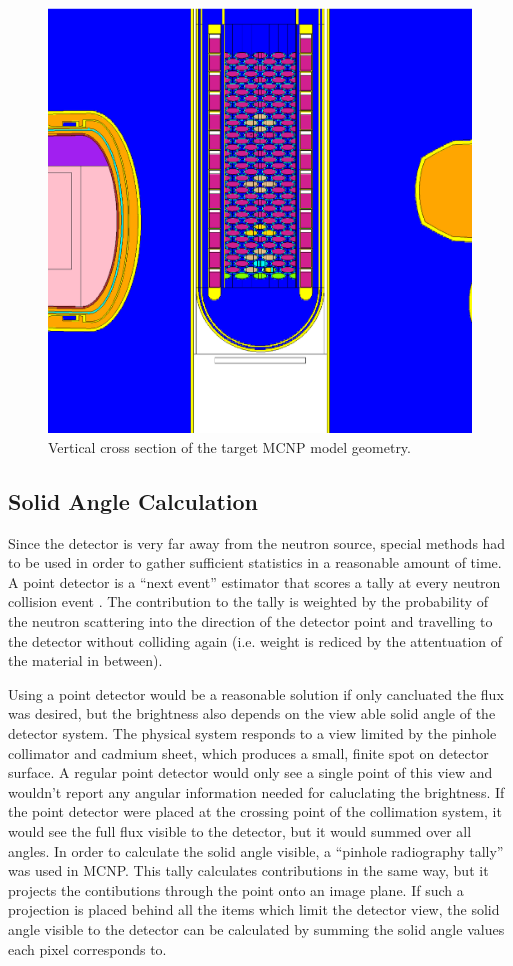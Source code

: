 \documentclass[preprint,12pt]{elsarticle}
\begin{document}
\begin{figure}[h!] 
  \centering
    \includegraphics[width=0.25\columnwidth,trim={5cm 0 5cm 0},clip]{graphics/target.eps}
     \caption{Vertical cross section of the target MCNP model geometry. \label{fig:target}}
\end{figure}

%
%
%
%
%

\subsection{Solid Angle Calculation}
\label{subsec:solidangle}

Since the detector is very far away from the neutron source, special methods had to be used in order to gather sufficient statistics in a reasonable amount of time.  A point detector is a ``next event'' estimator that scores a tally at every neutron collision event \cite{mcnp}.  The contribution to the tally is weighted by the probability of the neutron scattering into the direction of the detector point and travelling to the detector without colliding again (i.e. weight is rediced by the attentuation of the material in between).  

Using a point detector would be a reasonable solution if only cancluated the flux was desired, but the brightness also depends on the view able solid angle of the detector system.   The physical system responds to a view limited by the pinhole collimator and cadmium sheet, which produces a small, finite spot on detector surface.  A regular point detector would only see a single point of this view and wouldn't report any angular information needed for caluclating the brightness.  If the point detector were placed at the crossing point of the collimation system, it would see the full flux visible to the detector, but it would summed over all angles.  In order to calculate the solid angle visible, a ``pinhole radiography tally'' was used in MCNP.  This tally calculates contributions in the same way, but it projects the contibutions through the point onto an image plane.  If such a projection is placed behind all the items which limit the detector view, the solid angle visible to the detector can be calculated by summing the solid angle values each pixel corresponds to.
\end{document}
